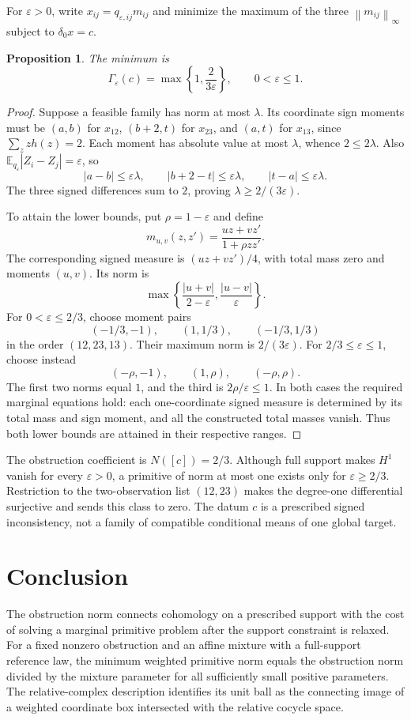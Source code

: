 \documentclass[11pt,a4paper]{article}
\numberwithin{equation}{section}
\newtheorem{proposition}[theorem]{Proposition}
\theoremstyle{remark}
\newcommand{\norm}[1]{\left\lVert #1\right\rVert}
\begin{document}
For $\varepsilon>0$, write $x_{ij}=q_{\varepsilon,ij}m_{ij}$ and minimize the maximum of the three $\norm{m_{ij}}_\infty$ subject to $\delta_0x=c$.
\begin{proposition}\label{prop:triangle}
The minimum is
\begin{equation}\label{eq:triangle}
 \Gamma_\varepsilon(c)=\max\left\{1,\frac{2}{3\varepsilon}\right\},
 \qquad 0<\varepsilon\le1.
\end{equation}
\end{proposition}
\begin{proof}
Suppose a feasible family has norm at most $\lambda$. Its coordinate sign moments must be $(a,b)$ for $x_{12}$, $(b+2,t)$ for $x_{23}$, and $(a,t)$ for $x_{13}$, since $\sum_z zh(z)=2$. Each moment has absolute value at most $\lambda$, whence $2\le2\lambda$. Also $\mathbb E_{q_\varepsilon}|Z_i-Z_j|=\varepsilon$, so
\[
 |a-b|\le\varepsilon\lambda,\qquad
 |b+2-t|\le\varepsilon\lambda,\qquad
 |t-a|\le\varepsilon\lambda.
\]
The three signed differences sum to $2$, proving $\lambda\ge2/(3\varepsilon)$.

To attain the lower bounds, put $\rho=1-\varepsilon$ and define
\[
 m_{u,v}(z,z')=\frac{uz+vz'}{1+\rho zz'}.
\]
The corresponding signed measure is $(uz+vz')/4$, with total mass zero and moments $(u,v)$. Its norm is
\[
 \max\left\{\frac{|u+v|}{2-\varepsilon},\frac{|u-v|}{\varepsilon}\right\}.
\]
For $0<\varepsilon\le2/3$, choose moment pairs
\[
 (-1/3,-1),\qquad (1,1/3),\qquad(-1/3,1/3)
\]
in the order $(12,23,13)$. Their maximum norm is $2/(3\varepsilon)$. For $2/3\le\varepsilon\le1$, choose instead
\[
 (-\rho,-1),\qquad(1,\rho),\qquad(-\rho,\rho).
\]
The first two norms equal $1$, and the third is $2\rho/\varepsilon\le1$. In both cases the required marginal equations hold: each one-coordinate signed measure is determined by its total mass and sign moment, and all the constructed total masses vanish. Thus both lower bounds are attained in their respective ranges.
\end{proof}
The obstruction coefficient is $N([c])=2/3$. Although full support makes $H^1$ vanish for every $\varepsilon>0$, a primitive of norm at most one exists only for $\varepsilon\ge2/3$. Restriction to the two-observation list $(12,23)$ makes the degree-one differential surjective and sends this class to zero. The datum $c$ is a prescribed signed inconsistency, not a family of compatible conditional means of one global target.

\section{Conclusion}
The obstruction norm connects cohomology on a prescribed support with the cost of solving a marginal primitive problem after the support constraint is relaxed. For a fixed nonzero obstruction and an affine mixture with a full-support reference law, the minimum weighted primitive norm equals the obstruction norm divided by the mixture parameter for all sufficiently small positive parameters. The relative-complex description identifies its unit ball as the connecting image of a weighted coordinate box intersected with the relative cocycle space.
\end{document}
